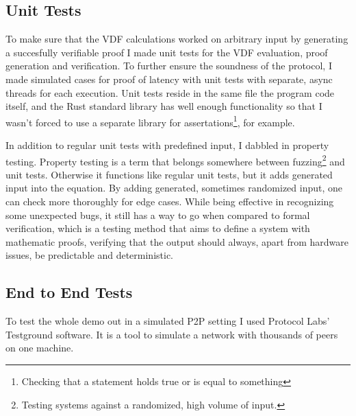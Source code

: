 \subsection{Unit Tests}
To make sure that the VDF calculations worked on arbitrary input by generating a succesfully verifiable proof I made unit tests for the VDF evaluation, proof generation and verification. To further ensure the soundness of the protocol, I made simulated cases for proof of latency with unit tests with separate, async threads for each execution. Unit tests reside in the same file the program code itself, and the Rust standard library has well enough functionality so that I wasn't forced to use a separate library for assertations\footnote{Checking that a statement holds true or is equal to something}, for example.

In addition to regular unit tests with predefined input, I dabbled in property testing. Property testing is a term that belongs somewhere between fuzzing\footnote{Testing systems against a randomized, high volume of input.} and unit tests. Otherwise it functions like regular unit tests, but it adds generated input into the equation. By adding generated, sometimes randomized input, one can check more thoroughly for edge cases. While being effective in recognizing some unexpected bugs, it still has a way to go when compared to formal verification, which is a testing method that aims to define a system with mathematic proofs, verifying that the output should always, apart from hardware issues, be predictable and deterministic.

\subsection{End to End Tests}
To test the whole demo out in a simulated P2P setting I used Protocol Labs' Testground software. It is a tool to simulate a network with thousands of peers on one machine.
